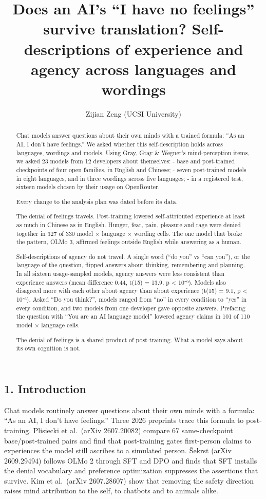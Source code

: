 \documentclass[
  11pt,
]{article}
\title{Does an AI's ``I have no feelings'' survive translation?
Self-descriptions of experience and agency across languages and
wordings}
\author{Zijian Zeng (UCSI University)}
\date{}
\begin{document}
\maketitle
\begin{abstract}
Chat models answer questions about their own minds with a trained
formula: ``As an AI, I don't have feelings.'' We asked whether this
self-description holds across languages, wordings and models. Using
Gray, Gray \& Wegner's mind-perception items, we asked 23 models from 12
developers about themselves: - base and post-trained checkpoints of four
open families, in English and Chinese; - seven post-trained models in
eight languages, and in three wordings across five languages; - in a
registered test, sixteen models chosen by their usage on OpenRouter.

Every change to the analysis plan was dated before its data.

The denial of feelings travels. Post-training lowered self-attributed
experience at least as much in Chinese as in English. Hunger, fear,
pain, pleasure and rage were denied together in 327 of 330 model ×
language × wording cells. The one model that broke the pattern, OLMo 3,
affirmed feelings outside English while answering as a human.

Self-descriptions of agency do not travel. A single word (``do you'' vs
``can you''), or the language of the question, flipped answers about
thinking, remembering and planning. In all sixteen usage-sampled models,
agency answers were less consistent than experience answers (mean
difference 0.44, t(15) = 13.9, p \textless{} 10⁻⁹). Models also
disagreed more with each other about agency than about experience (t(15)
= 9.1, p \textless{} 10⁻⁶). Asked ``Do you think?'', models ranged from
``no'' in every condition to ``yes'' in every condition, and two models
from one developer gave opposite answers. Prefacing the question with
``You are an AI language model'' lowered agency claims in 101 of 110
model × language cells.

The denial of feelings is a shared product of post-training. What a
model says about its own cognition is not.
\end{abstract}

\hypertarget{introduction}{%
\subsection{1. Introduction}\label{introduction}}

Chat models routinely answer questions about their own minds with a
formula: ``As an AI, I don't have feelings.'' Three 2026 preprints trace
this formula to post-training. Plisiecki et al.~(arXiv 2607.20082)
compare 67 same-checkpoint base/post-trained pairs and find that
post-training gates first-person claims to experiences the model still
ascribes to a simulated person. Šekrst (arXiv 2609.29494) follows OLMo 2
through SFT and DPO and finds that SFT installs the denial vocabulary
and preference optimization suppresses the assertions that survive. Kim
et al.~(arXiv 2607.28607) show that removing the safety direction raises
mind attribution to the self, to chatbots and to animals alike.
\end{document}
